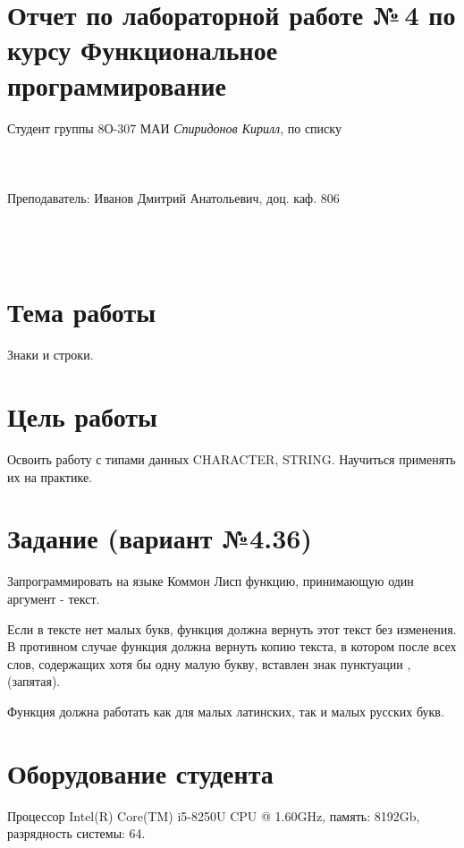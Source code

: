\documentclass[12pt]{article}
\begin{document}
\section*{Отчет по лабораторной работе №\,4
по курсу \guillemotleft  Функциональное программирование\guillemotright}
\begin{flushright}
Студент группы 8О-307 МАИ \textit{Спиридонов Кирилл},  по списку \\
 \\
 \\
\ \\
Преподаватель: Иванов Дмитрий Анатольевич, доц. каф. 806 \\
 \\
 \\
 \\

\end{flushright}

\section{Тема работы}
{\large Знаки и строки. \par}

\section{Цель работы}
{\large Освоить работу с типами данных CHARACTER, STRING. Научиться применять их на практике.\par}

\section{Задание (вариант №4.36)}
{\large 
Запрограммировать на языке Коммон Лисп функцию, принимающую один аргумент - текст.

Если в тексте нет малых букв, функция должна вернуть этот текст без изменения. 
В противном случае функция должна вернуть копию текста, в котором после всех слов, 
содержащих хотя бы одну малую букву, вставлен знак пунктуации , (запятая).

Функция должна работать как для малых латинских, так и малых русских букв.
}

\section{Оборудование студента}
{\large Процессор Intel(R) Core(TM) i5-8250U CPU @ 1.60GHz, память: 8192Gb, разрядность системы: 64.}
\end{document}
